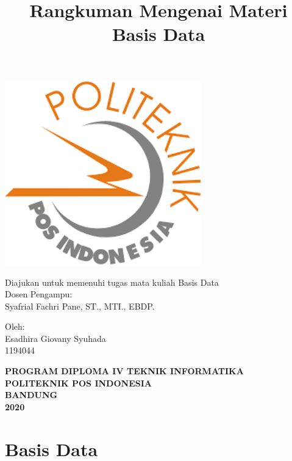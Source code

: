 \documentclass[12pt , a4paper]{article}
\title{Rangkuman Mengenai Materi Basis Data}
\author{}
\date{}
\begin{document}
\begin{titlepage}
\maketitle
\thispagestyle{empty}

\vspace{0.5cm}
\begin{center}
\includegraphics[width=8.5cm, height=8cm]{poltekpos.png}
\end{center}
\vspace{0.5cm}
\begin{center}
Diajukan untuk memenuhi tugas mata kuliah Basis Data\\
\vspace{12px}
Dosen Pengampu:\\
Syafrial Fachri Pane, ST., MTI., EBDP.
\vspace{12px}

Oleh:\\
Esadhira Giovany Syuhada\\
1194044
\vspace{14px}

\textbf{PROGRAM DIPLOMA IV TEKNIK INFORMATIKA}\\
\textbf{POLITEKNIK POS INDONESIA\\}\textbf{BANDUNG}\\
\textbf{2020}
\end{center}
\end{titlepage}


\newpage
\maketitle
\section{Basis Data}
\end{document}
